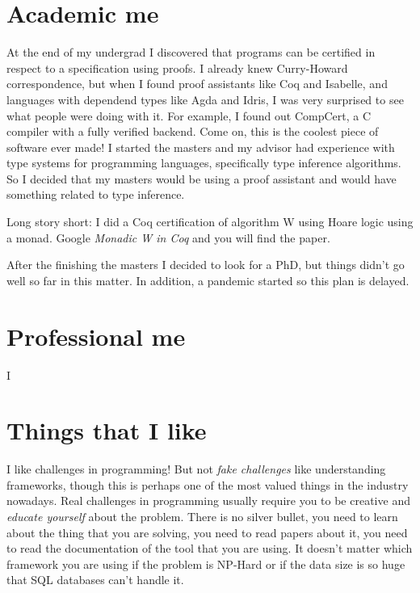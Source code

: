 \documentclass[11pt,a4paper,sans]{moderncv}
\begin{document}
\section{Academic me}
At the end of my undergrad I discovered that programs can be certified in respect to a specification using proofs.
I already knew Curry-Howard correspondence, but when I found proof assistants like Coq and Isabelle, and languages with dependend types like Agda and Idris, I was very surprised to see what people were doing with it.
For example, I found out CompCert, a C compiler with a fully verified backend.
Come on, this is the coolest piece of software ever made!
I started the masters and my advisor had experience with type systems for programming languages, specifically type inference algorithms.
So I decided that my masters would be using a proof assistant and would have something related to type inference.

\medskip

Long story short: I did a Coq certification of algorithm W using Hoare logic using a monad.
Google \textit{Monadic W in Coq} and you will find the paper.

\medskip

After the finishing the masters I decided to look for a PhD, but things didn't go well so far in this matter.
In addition, a pandemic started so this plan is delayed.

\section{Professional me}
I

\section{Things that I like}
I like challenges in programming! But not \textit{fake challenges} like understanding frameworks, though this is perhaps one of the most valued things in the industry nowadays.
Real challenges in programming usually require you to be creative and \textit{educate yourself} about the problem.
There is no silver bullet, you need to learn about the thing that you are solving, you need to read papers about it, you need to read the documentation of the tool that you are using.
It doesn't matter which framework you are using if the problem is NP-Hard or if the data size is so huge that SQL databases can't handle it.
\end{document}
